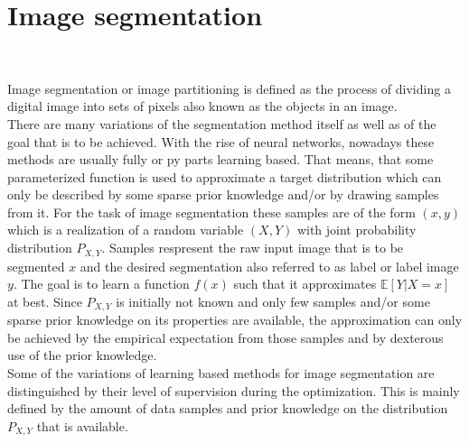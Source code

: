 \section{Image segmentation}~\label{sec:prel_imagesegmentation}

Image segmentation or image partitioning is defined as the process of dividing a digital image into sets of pixels also known as the objects in an image.\\
There are many variations of the segmentation method itself as well as of the goal that is to be achieved. With the rise of neural networks, nowadays these methods are usually fully or py parts learning based. That means, that some parameterized function is used to approximate a target distribution which can only be described by some sparse prior knowledge and/or by drawing samples from it. For the task of image segmentation these samples are of the form $(x, y)$ which is a realization of a random variable $(X, Y)$ with joint probability distribution $P_{X, Y}$. Samples respresent the raw input image that is to be segmented $x$ and the desired segmentation also referred to as label or label image $y$. The goal is to learn a function $f(x)$ such that it approximates $\mathbb{E}[Y|X=x]$ at best. Since $P_{X, Y}$ is initially not known and only few samples and/or some sparse prior knowledge on its properties are available, the approximation can only be achieved by the empirical expectation from those samples and by dexterous use of the prior knowledge. \\
Some of the variations of learning based methods for image segmentation are distinguished by their level of supervision during the optimization. This is mainly defined by the amount of data samples and prior knowledge on the distribution $P_{X, Y}$ that is available.

